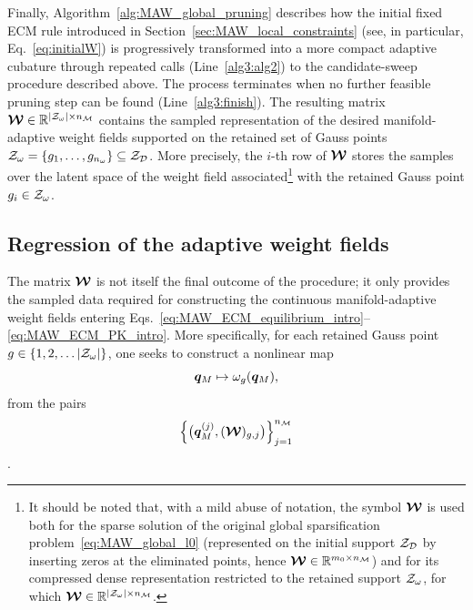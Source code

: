 \documentclass[11pt,a4paper]{article}
\begin{document}
Finally, Algorithm~\ref{alg:MAW_global_pruning} describes how the initial
fixed ECM rule introduced in
Section~\ref{sec:MAW_local_constraints} (see, in particular,
Eq.~\eqref{eq:initialW}) is progressively transformed into a more compact
 adaptive cubature   through repeated calls
(Line~\ref{alg3:alg2}) to the candidate-sweep procedure described above. The process terminates when no further feasible
pruning step can be found (Line~\ref{alg3:finish}). The resulting matrix
\(
\boldsymbol{\mathcal{W}}\in\mathbb{R}^{|\mathcal{Z}_{\omega}|\times n_{\mathcal{M}}}
\)
contains the sampled representation of the desired manifold-adaptive weight
fields supported on the retained set of Gauss points
\(\mathcal{Z}_{\omega}=\{g_1,\ldots,g_{n_{\omega}}\}\subseteq\mathcal{Z}_{\mathcal{D}}\). More precisely, the
\(i\)-th row of \(\boldsymbol{\mathcal{W}}\) stores the samples over the latent space of the
 weight field associated\footnote{It should be noted that, with a mild
abuse of notation, the symbol \(\boldsymbol{\mathcal{W}}\) is used both for the sparse
solution of the original global sparsification
problem~\eqref{eq:MAW_global_l0} (represented on the initial support
\(\mathcal{Z}_{\mathcal{D}}\) by inserting zeros at the eliminated points, hence
\(\boldsymbol{\mathcal{W}}\in\mathbb{R}^{m_0\times n_{\mathcal{M}}}\)) and for its compressed dense
representation restricted to the retained support \(\mathcal{Z}_{\omega}\), for which
\(\boldsymbol{\mathcal{W}}\in\mathbb{R}^{|\mathcal{Z}_{\omega}|\times n_{\mathcal{M}}}\).}  with the retained Gauss point \(g_i\in\mathcal{Z}_{\omega}\).



\subsection{Regression of the adaptive weight fields}
\label{sec:regression}
The matrix \(\boldsymbol{\mathcal{W}}\) is not itself the final outcome of the procedure; it
only provides the sampled data required for constructing the continuous
manifold-adaptive weight fields entering
Eqs.~\eqref{eq:MAW_ECM_equilibrium_intro}--%
\eqref{eq:MAW_ECM_PK_intro}. More specifically, for each retained Gauss
point \(g \in \{1,2, \ldots |\mathcal{Z}_{\omega}|\}\), one seeks to construct a nonlinear map
\begin{equation}
\label{eq:3dssdddd}
    \bm{q}_M
    \mapsto
    \omega_{g}(\bm{q}_M),
\end{equation}
from the pairs
\begin{equation}
\label{eq:pairs}
  \left\{
    \big(\bm{q}_M^{(j)},(\boldsymbol{\mathcal{W}})_{g,j}\big)
    \right\}_{j=1}^{n_{\mathcal{M}}}
\end{equation}.
\end{document}
